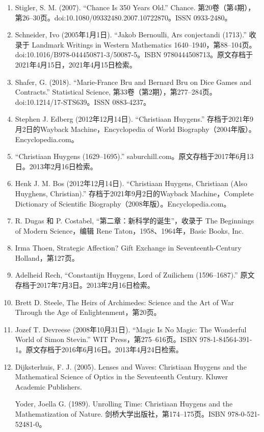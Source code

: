\begin{enumerate}
\item Stigler, S. M. (2007). “Chance Is 350 Years Old.” Chance. 第20卷（第4期），第26–30页。doi:10.1080/09332480.2007.10722870。ISSN 0933-2480。
\item Schneider, Ivo (2005年1月1日). “Jakob Bernoulli, Ars conjectandi (1713).” 收录于 Landmark Writings in Western Mathematics 1640–1940，第88–104页。doi:10.1016/B978-044450871-3/50087-5。ISBN 9780444508713。原文存档于2021年4月15日，2021年4月15日检索。
\item Shafer, G. (2018). “Marie-France Bru and Bernard Bru on Dice Games and Contracts.” Statistical Science, 第33卷（第2期），第277–284页。doi:10.1214/17-STS639。ISSN 0883-4237。
\item Stephen J. Edberg (2012年12月14日). “Christiaan Huygens.” 存档于2021年9月2日的Wayback Machine，Encyclopedia of World Biography（2004年版）。Encyclopedia.com。
\item “Christiaan Huygens (1629–1695).” saburchill.com。原文存档于2017年6月13日。2013年2月16日检索。
\item Henk J. M. Bos (2012年12月14日). “Christiaan Huygens, Christiaan (Also Huyghens, Christian).” 存档于2021年9月2日的Wayback Machine，Complete Dictionary of Scientific Biography（2008年版）。Encyclopedia.com。
\item R. Dugas 和 P. Costabel, “第二章：新科学的诞生”，收录于 The Beginnings of Modern Science，编辑 Rene Taton，1958、1964年，Basic Books, Inc.
\item Irma Thoen, Strategic Affection? Gift Exchange in Seventeenth-Century Holland，第127页。
\item Adelheid Rech, “Constantijn Huygens, Lord of Zuilichem (1596–1687).” 原文存档于2017年7月3日。2013年2月16日检索。
\item Brett D. Steele, The Heirs of Archimedes: Science and the Art of War Through the Age of Enlightenment，第20页。
\item Jozef T. Devreese (2008年10月31日). “Magic Is No Magic: The Wonderful World of Simon Stevin.” WIT Press，第275–616页。ISBN 978-1-84564-391-1。原文存档于2016年6月16日。2013年4月24日检索。
\item Dijksterhuis, F. J. (2005). Lenses and Waves: Christiaan Huygens and the Mathematical Science of Optics in the Seventeenth Century. Kluwer Academic Publishers.

Yoder, Joella G. (1989). Unrolling Time: Christiaan Huygens and the Mathematization of Nature. 剑桥大学出版社，第174–175页。ISBN 978-0-521-52481-0。


\end{enumerate}
